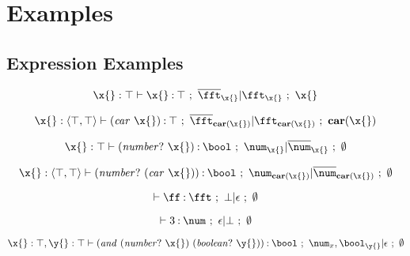 \documentclass{article}[12pt]
\begin{document}
\newpage
\section{Examples}

\subsection{Expression Examples}

\newcommand{\nump}[1]{\ma{\comb{\numberp}{#1}}}

\newcommand{\carx}{\ma{\comb{\car}{\x{ }}}}

\newcommand{\pecarx}{\ma{\pecar(\x{})}}
\newcommand{\pecarcarx}{\ma{\pecar(\pecar(\x{}))}}

\newcommand{\xenv}[1]{\x{}:{#1}}
\newcommand{\xenvtop}{\xenv{\top}}
\newcommand{\xyenv}{\xenvtop,\y{}:\top}


\newcommand{\numpx}{\nump{\x{}}}
\newcommand{\boolpx}{\comb{\boolp}{\x{}}}
\newcommand{\boolpy}{\comb{\boolp}{\y{}}}

\newcommand{\cand}[2]{\comb{\andsym}{{#1}\ {#2}}}
\newcommand{\cor}[2]{\comb{\orsym}{{#1}\ {#2}}}

\newcommand{\numbool}{{(\usym\ \num\ \bool)}}
\newcommand{\inumbool}{{(\isym\ \num\ \bool)}}


\begin{displaymath}
  \hastyvar[\xenvtop]{\x{}}{\top}{\x{}}
\end{displaymath}

\begin{displaymath}
  \hastyvar[{\xenv{\consty{\top}{\top}}{}}]{\carx{}}{\top}{\pecarx{}}
\end{displaymath}

\begin{displaymath}
  \hastypred [\xenvtop] {\numpx} {\num} {\x{}}
\end{displaymath}

\begin{displaymath}
  \hastypred [\xenv{\consty{\top}{\top}}] {\nump{\carx}} {\num} {\pecarx}
\end{displaymath}

\begin{displaymath}
  \hastyfalse[\empty]{\ff}{\fft}
\end{displaymath}

\begin{displaymath}
  \hastytrue[\empty]{3}{\num}
\end{displaymath}

\begin{displaymath}
  \hastyeff[\xyenv] {\cand{\numpx}{\boolpy}} {\bool} {\num_{x{}},\bool_{\y{}}}  {\bullet} {\noeffect}
\end{displaymath}
\end{document}
